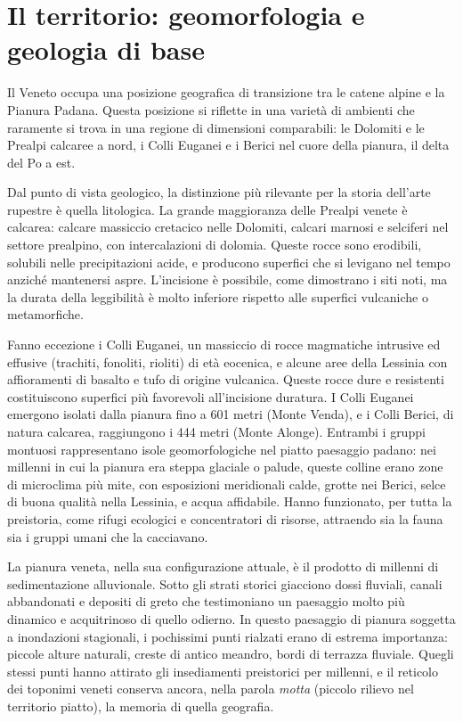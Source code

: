 \section{Il territorio: geomorfologia e geologia di base}

Il Veneto occupa una posizione geografica di transizione tra le catene alpine e la Pianura Padana. Questa posizione si riflette in una varietà di ambienti che raramente si trova in una regione di dimensioni comparabili: le Dolomiti e le Prealpi calcaree a nord, i Colli Euganei e i Berici nel cuore della pianura, il delta del Po a est.

Dal punto di vista geologico, la distinzione più rilevante per la storia dell'arte rupestre è quella litologica. La grande maggioranza delle Prealpi venete è calcarea: calcare massiccio cretacico nelle Dolomiti, calcari marnosi e selciferi nel settore prealpino, con intercalazioni di dolomia. Queste rocce sono erodibili, solubili nelle precipitazioni acide, e producono superfici che si levigano nel tempo anziché mantenersi aspre. L'incisione è possibile, come dimostrano i siti noti, ma la durata della leggibilità è molto inferiore rispetto alle superfici vulcaniche o metamorfiche.

Fanno eccezione i Colli Euganei, un massiccio di rocce magmatiche intrusive ed effusive (trachiti, fonoliti, rioliti) di età eocenica, e alcune aree della Lessinia con affioramenti di basalto e tufo di origine vulcanica. Queste rocce dure e resistenti costituiscono superfici più favorevoli all'incisione duratura. I Colli Euganei emergono isolati dalla pianura fino a 601 metri (Monte Venda), e i Colli Berici, di natura calcarea, raggiungono i 444 metri (Monte Alonge). Entrambi i gruppi montuosi rappresentano isole geomorfologiche nel piatto paesaggio padano: nei millenni in cui la pianura era steppa glaciale o palude, queste colline erano zone di microclima più mite, con esposizioni meridionali calde, grotte nei Berici, selce di buona qualità nella Lessinia, e acqua affidabile. Hanno funzionato, per tutta la preistoria, come rifugi ecologici e concentratori di risorse, attraendo sia la fauna sia i gruppi umani che la cacciavano.

La pianura veneta, nella sua configurazione attuale, è il prodotto di millenni di sedimentazione alluvionale. Sotto gli strati storici giacciono dossi fluviali, canali abbandonati e depositi di greto che testimoniano un paesaggio molto più dinamico e acquitrinoso di quello odierno. In questo paesaggio di pianura soggetta a inondazioni stagionali, i pochissimi punti rialzati erano di estrema importanza: piccole alture naturali, creste di antico meandro, bordi di terrazza fluviale. Quegli stessi punti hanno attirato gli insediamenti preistorici per millenni, e il reticolo dei toponimi veneti conserva ancora, nella parola \textit{motta} (piccolo rilievo nel territorio piatto), la memoria di quella geografia.

